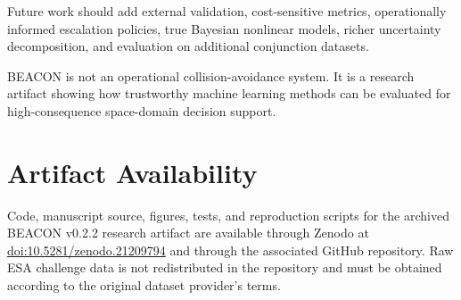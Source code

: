 \documentclass[11pt]{article}
\begin{document}
Future work should add external validation, cost-sensitive metrics, operationally informed escalation policies, true Bayesian nonlinear models, richer uncertainty decomposition, and evaluation on additional conjunction datasets.

BEACON is not an operational collision-avoidance system. It is a research artifact showing how trustworthy machine learning methods can be evaluated for high-consequence space-domain decision support.

\section*{Artifact Availability}

Code, manuscript source, figures, tests, and reproduction scripts for the archived BEACON v0.2.2 research artifact are available through Zenodo at \href{https://doi.org/10.5281/zenodo.21209794}{doi:10.5281/zenodo.21209794} and through the associated GitHub repository. Raw ESA challenge data is not redistributed in the repository and must be obtained according to the original dataset provider's terms.



\end{document}
